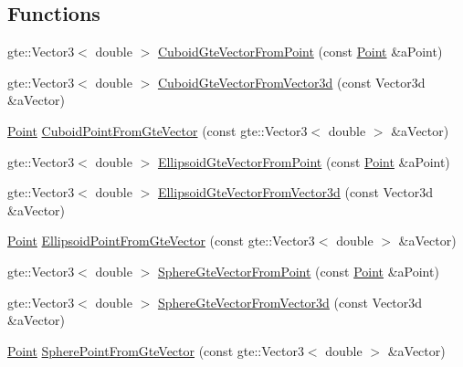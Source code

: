 \subsection*{Functions}
\begin{DoxyCompactItemize}
\item 
gte\+::\+Vector3$<$ double $>$ \hyperlink{namespacelibrary_1_1math_1_1geom_1_1d3_1_1objects_a96c8edec8956345c9f085ef3073f1b3f}{Cuboid\+Gte\+Vector\+From\+Point} (const \hyperlink{classlibrary_1_1math_1_1geom_1_1d3_1_1objects_1_1_point}{Point} \&a\+Point)
\item 
gte\+::\+Vector3$<$ double $>$ \hyperlink{namespacelibrary_1_1math_1_1geom_1_1d3_1_1objects_a0afd2257f7c64d3588b9fd1f239e8c61}{Cuboid\+Gte\+Vector\+From\+Vector3d} (const Vector3d \&a\+Vector)
\item 
\hyperlink{classlibrary_1_1math_1_1geom_1_1d3_1_1objects_1_1_point}{Point} \hyperlink{namespacelibrary_1_1math_1_1geom_1_1d3_1_1objects_aec9df7f7d4b4c86cbc01f8cac5bd7268}{Cuboid\+Point\+From\+Gte\+Vector} (const gte\+::\+Vector3$<$ double $>$ \&a\+Vector)
\item 
gte\+::\+Vector3$<$ double $>$ \hyperlink{namespacelibrary_1_1math_1_1geom_1_1d3_1_1objects_ab4aff8d4a8f32b0cb22adb8a3ae1b2d8}{Ellipsoid\+Gte\+Vector\+From\+Point} (const \hyperlink{classlibrary_1_1math_1_1geom_1_1d3_1_1objects_1_1_point}{Point} \&a\+Point)
\item 
gte\+::\+Vector3$<$ double $>$ \hyperlink{namespacelibrary_1_1math_1_1geom_1_1d3_1_1objects_a907b60e23a36bd9550b27f90380c347e}{Ellipsoid\+Gte\+Vector\+From\+Vector3d} (const Vector3d \&a\+Vector)
\item 
\hyperlink{classlibrary_1_1math_1_1geom_1_1d3_1_1objects_1_1_point}{Point} \hyperlink{namespacelibrary_1_1math_1_1geom_1_1d3_1_1objects_afba4450ebf70aa313406e81b624abb96}{Ellipsoid\+Point\+From\+Gte\+Vector} (const gte\+::\+Vector3$<$ double $>$ \&a\+Vector)
\item 
gte\+::\+Vector3$<$ double $>$ \hyperlink{namespacelibrary_1_1math_1_1geom_1_1d3_1_1objects_a1cd4cc36a3501c95c8405d9f199b15a5}{Sphere\+Gte\+Vector\+From\+Point} (const \hyperlink{classlibrary_1_1math_1_1geom_1_1d3_1_1objects_1_1_point}{Point} \&a\+Point)
\item 
gte\+::\+Vector3$<$ double $>$ \hyperlink{namespacelibrary_1_1math_1_1geom_1_1d3_1_1objects_a45927d15533f5f5dc1a1c4d8b0503d2e}{Sphere\+Gte\+Vector\+From\+Vector3d} (const Vector3d \&a\+Vector)
\item 
\hyperlink{classlibrary_1_1math_1_1geom_1_1d3_1_1objects_1_1_point}{Point} \hyperlink{namespacelibrary_1_1math_1_1geom_1_1d3_1_1objects_af039374e979fbf4b307378cced254d98}{Sphere\+Point\+From\+Gte\+Vector} (const gte\+::\+Vector3$<$ double $>$ \&a\+Vector)
\end{DoxyCompactItemize}


